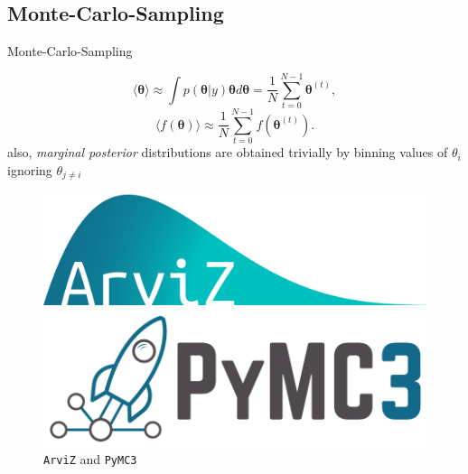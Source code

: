 \documentclass[11pt,aspectratio=1610,dvipsnames]{beamer}
\begin{document}
\subsection{Monte-Carlo-Sampling}
\begin{frame}{Monte-Carlo-Sampling}
	\begin{minipage}{\linewidth}
		\begin{minipage}{0.6\linewidth}
			\begin{tcolorbox}[colback=black!5,colframe=gray!15!black,title={Benefits of Monte-Carlo-Sampling}] 
				 \begin{equation}
					\langle \boldsymbol{\theta}\rangle\approx \int p(\boldsymbol{\theta} | y)\boldsymbol{\theta}d\boldsymbol{\theta}=\frac{1}{N}\sum_{t=0}^{N-1}\boldsymbol{\theta}^{(t)},
				\end{equation}
				 \begin{equation}
					\langle f(\boldsymbol{\theta})\rangle\approx\frac{1}{N}\sum_{t=0}^{N-1}f(\boldsymbol{\theta}^{(t)}).
				\end{equation}
				also, \emph{marginal posterior} distributions are obtained trivially by binning values of $\theta_i$ ignoring $\theta_{j\neq i}$ \citet{Trotta_2008}
			\end{tcolorbox}
		\end{minipage}
		\hfill
		\begin{minipage}{0.3\linewidth}
			\begin{figure}
				\includegraphics[width=\linewidth]{arviz_logo}
				\vspace{0.1cm}
				
				\includegraphics[width=\linewidth]{PyMC3_banner}
				\caption{\texttt{ArviZ} \citet{ArviZ} and \texttt{PyMC3} \citet{PyMC3}}
			\end{figure}
			
		\end{minipage}
	\end{minipage}
	
	
\end{frame}
\end{document}
